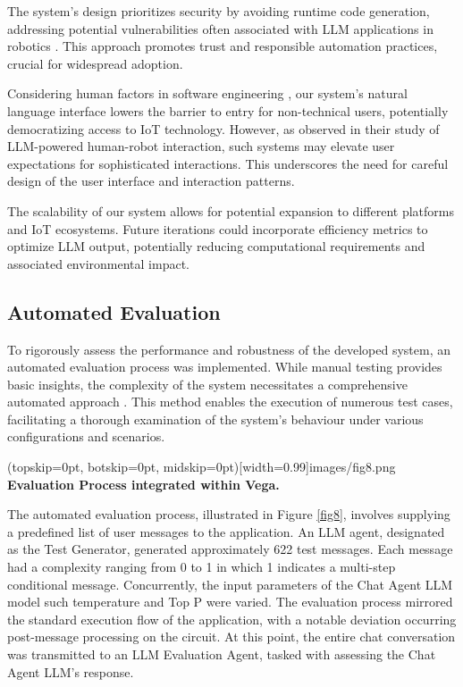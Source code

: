 \documentclass{ieeeaccess}
\begin{document}
The system's design prioritizes security by avoiding runtime code generation, addressing potential vulnerabilities often associated with LLM applications in robotics \cite{wang2024gensimgeneratingroboticsimulation}. This approach promotes trust and responsible automation practices, crucial for widespread adoption.

Considering human factors in software engineering \cite{1553657}, our system's natural language interface lowers the barrier to entry for non-technical users, potentially democratizing access to IoT technology. However, as \citet{10.1145/3610977.3634966} observed in their study of LLM-powered human-robot interaction, such systems may elevate user expectations for sophisticated interactions. This underscores the need for careful design of the user interface and interaction patterns.

The scalability of our system allows for potential expansion to different platforms and IoT ecosystems. Future iterations could incorporate efficiency metrics to optimize LLM output, potentially reducing computational requirements and associated environmental impact.

\subsection{Automated Evaluation}
To rigorously assess the performance and robustness of the developed system, an automated evaluation process was implemented. While manual testing provides basic insights, the complexity of the system necessitates a comprehensive automated approach \cite{1290484}. This method enables the execution of numerous test cases, facilitating a thorough examination of the system's behaviour under various configurations and scenarios.

\Figure[t!](topskip=0pt, botskip=0pt, midskip=0pt)[width=0.99\columnwidth]{{images/fig8.png}}
{ \textbf{Evaluation Process integrated within Vega.}\label{fig8}}

The automated evaluation process, illustrated in Figure \ref{fig8}, involves supplying a predefined list of user messages to the application. An LLM agent, designated as the Test Generator, generated approximately 622 test messages. Each message had a complexity ranging from 0 to 1 in which 1 indicates a multi-step conditional message. Concurrently, the input parameters of the Chat Agent LLM model such temperature and Top P \cite{rum2024setting} were varied. The evaluation process mirrored the standard execution flow of the application, with a notable deviation occurring post-message processing on the circuit. At this point, the entire chat conversation was transmitted to an LLM Evaluation Agent, tasked with assessing the Chat Agent LLM's response. 
\end{document}
